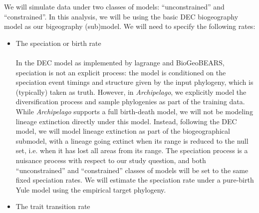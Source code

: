 \documentclass[11pt,openany]{memoir} %
\newcommand{\archipelagoModel}{\textit{Archipelago}\xspace}
\begin{document}
We will simulate data under two classes of models: ``unconstrained'' and ``constrained''.
In this analysis, we will be using the basic DEC biogeography model as our bigeography (sub)model.
We will need to specify the following rates:

\begin{itemize}
    \item The speciation or birth rate \hfill \\
        \\
        In the DEC model as implemented by lagrange and BioGeoBEARS, speciation is not an explicit process: the model is conditioned on the speciation event timings and structure given by the input phylogeny, which is (typically) taken as truth.
        However, in \archipelagoModel, we explicitly model the diversification process and sample phylogenies as part of the training data.
        While \archipelagoModel supports a full birth-death model, we will not be modeling lineage extinction directly under this model.
        Instead, following the DEC model, we will model lineage extinction as part of the biogeographical submodel, with a lineage going extinct when its range is reduced to the null set, i.e. when it has lost all areas from its range.
        The speciation process is a nuisance process with respect to our study question, and both ``unconstrained'' and ``constrained'' classes of models will be set to the same fixed speciation rates.
        We will estimate the speciation rate under a pure-birth Yule model using the empirical target phylogeny.
    \item The trait transition rate \hfill \\

\end{itemize}
\end{document}
